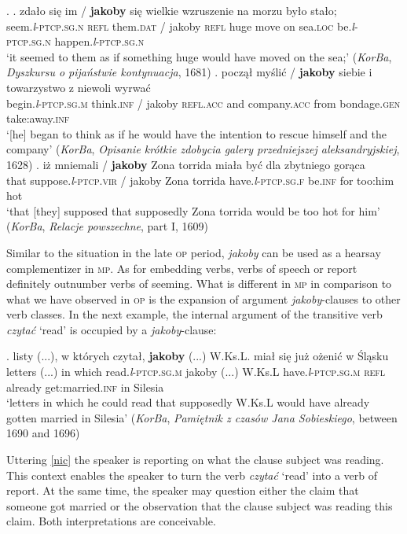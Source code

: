 \documentclass[output=paper
,modfonts
,nonflat]{langsci/langscibook}
\newcommand{\glossformat}[1]{\textsc{#1}}
\newcommand{\acc}{\glossformat{acc}\xspace}
\newcommand{\dat}{\glossformat{dat}\xspace}
\newcommand{\fem}{\glossformat{f}\xspace}
\newcommand{\gen}{\glossformat{gen}\xspace}
\newcommand{\infv}{\glossformat{inf}\xspace}
\newcommand{\loc}{\glossformat{loc}\xspace}
\newcommand{\lptcp}{\emph{l}\glossformat{-ptcp}\xspace}
\newcommand{\masc}{\glossformat{m}\xspace}
\newcommand{\n}{\glossformat{n}\xspace}
\newcommand{\refl}{\glossformat{refl}\xspace}
\newcommand{\sg}{\glossformat{sg}\xspace}
\newcommand{\vir}{\glossformat{vir}\xspace}
\newcommand{\nquelle}[1]{\newline\phantom{x}\hfill(#1)}
\begin{document}
\ex.	\ag.	zdało się im / \textbf{jakoby} się wielkie wzruszenie na morzu było stało; \label{korba_seem} \\ 
		seem.{\lptcp}.{\sg}.{\n} {\refl} them.{\dat} / jakoby {\refl} huge move on sea.{\loc} be.{\lptcp}.{\sg}.{\n} happen.{\lptcp}.{\sg}.{\n} \\
		`it seemed to them as if something huge would have moved on the sea;' \nquelle{\emph{KorBa}, \emph{Dyszkursu o pijaństwie kontynuacja}, 1681} 	 
	\bg.	począł myślić / \textbf{jakoby} siebie i towarzystwo z niewoli wyrwać \label{korba_think} \\
		begin.{\lptcp}.{\sg}.{\masc} think.{\infv} / jakoby {\refl}.{\acc} and company.{\acc} from bondage.{\gen} take:away.{\infv} \\
		`[he] began to think as if he would have the intention to rescue himself and the company' \nquelle{\emph{KorBa}, \emph{Opisanie krótkie zdobycia galery przedniejszej aleksandryjskiej}, 1628} 	   
	\cg.	iż mniemali / \textbf{jakoby} Zona torrida miała być dla zbytniego gorąca \label{korba_suppose} \\
		that suppose.{\lptcp}.{\vir} / jakoby Zona torrida have.{\lptcp}.{\sg}.{\fem} be.{\infv} for {too:him} hot \\
		`that [they] supposed that supposedly Zona torrida would be too hot for him' \nquelle{\emph{KorBa}, \emph{Relacje powszechne}, part I, 1609} 
		
Similar to the situation in the late \textsc{op} period, \emph{jakoby} can be used as a hearsay complementizer in \textsc{mp}. As for embedding verbs, verbs of speech or report definitely outnumber verbs of seeming. What is different in \textsc{mp} in comparison to what we have observed in \textsc{op} is the expansion of argument \emph{jakoby}-clauses to other verb classes. In the next example, the internal argument of the transitive verb \emph{czytać} `read' is occupied by a \emph{jakoby}-clause:

\exg.		listy (...), w których czytał, \textbf{jakoby} (...) W.Ks.L. miał się już ożenić w Śląsku \label{nic} \\
		letters (...) in which read.{\lptcp}.{\sg}.{\masc} jakoby (...) W.Ks.L have.{\lptcp}.{\sg}.{\masc} {\refl} already {get:married}.{\infv} in Silesia \\
		 `letters in which he could read that supposedly W.Ks.L would have already gotten married in Silesia' \nquelle{\emph{KorBa}, \emph{Pamiętnik z czasów Jana Sobieskiego}, between 1690 and 1696} 

Uttering \ref{nic} the speaker is reporting on what the clause subject was reading. This context enables the speaker to turn the verb \emph{czytać} `read' into a verb of report. At the same time, the speaker may question either the claim that someone got married or the observation that the clause subject was reading this claim. Both interpretations are conceivable. 
\end{document}
